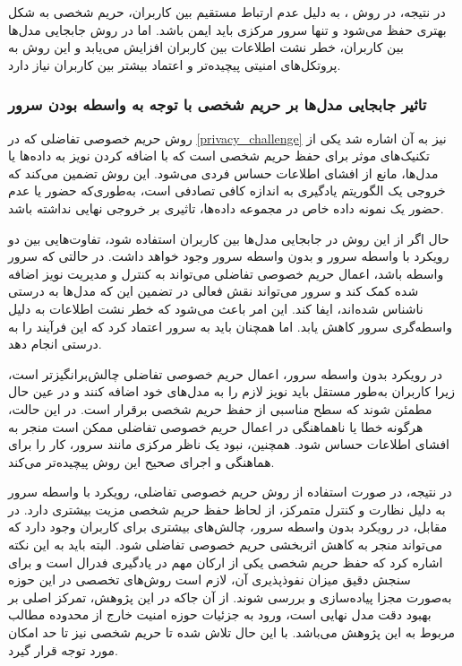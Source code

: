 در نتیجه، در روش
%
، به دلیل عدم ارتباط مستقیم بین کاربران، حریم شخصی به شکل بهتری حفظ می‌شود و تنها سرور مرکزی باید ایمن باشد. اما در روش جابجایی مدل‌ها بین کاربران، خطر نشت اطلاعات بین کاربران افزایش می‌یابد و این روش به پروتکل‌های امنیتی پیچیده‌تر و اعتماد بیشتر بین کاربران نیاز دارد.


\subsubsection{
	تاثیر جابجایی مدل‌ها بر حریم شخصی با توجه به واسطه بودن سرور
}
روش حریم خصوصی تفاضلی که در
\ref{privacy_challenge}
نیز به آن اشاره شد یکی از تکنیک‌های موثر برای حفظ حریم شخصی است که با اضافه کردن نویز به داده‌ها یا مدل‌ها، مانع از افشای اطلاعات حساس فردی می‌شود. این روش تضمین می‌کند که خروجی یک الگوریتم یادگیری به اندازه کافی تصادفی است، به‌طوری‌که حضور یا عدم حضور یک نمونه داده خاص در مجموعه داده‌ها، تاثیری بر خروجی نهایی نداشته باشد.

حال اگر از این روش در جابجایی مدل‌ها بین کاربران استفاده شود، تفاوت‌هایی بین دو رویکرد با واسطه سرور و بدون واسطه سرور وجود خواهد داشت. در حالتی که سرور واسطه باشد، اعمال حریم خصوصی تفاضلی می‌تواند به کنترل و مدیریت نویز اضافه شده کمک کند و سرور می‌تواند نقش فعالی در تضمین این که مدل‌ها به درستی ناشناس‌ شده‌اند، ایفا کند. این امر باعث می‌شود که خطر نشت اطلاعات به دلیل واسطه‌گری سرور کاهش یابد. اما همچنان باید به سرور اعتماد کرد که این فرآیند را به درستی انجام دهد.

در رویکرد بدون واسطه سرور، اعمال حریم خصوصی تفاضلی چالش‌برانگیزتر است، زیرا کاربران به‌طور مستقل باید نویز لازم را به مدل‌های خود اضافه کنند و در عین حال مطمئن شوند که سطح مناسبی از حفظ حریم شخصی برقرار است. در این حالت، هرگونه خطا یا ناهماهنگی در اعمال حریم خصوصی تفاضلی ممکن است منجر به افشای اطلاعات حساس شود. همچنین، نبود یک ناظر مرکزی مانند سرور، کار را برای هماهنگی و اجرای صحیح این روش پیچیده‌تر می‌کند.

در نتیجه، در صورت استفاده از روش حریم خصوصی تفاضلی، رویکرد با واسطه سرور به دلیل نظارت و کنترل متمرکز، از لحاظ حفظ حریم شخصی مزیت بیشتری دارد. در مقابل، در رویکرد بدون واسطه سرور، چالش‌های بیشتری برای کاربران وجود دارد که می‌تواند منجر به کاهش اثربخشی حریم خصوصی تفاضلی شود.
البته باید به این نکته اشاره کرد که حفظ حریم شخصی یکی از ارکان مهم در یادگیری فدرال است و برای سنجش دقیق میزان نفوذپذیری آن، لازم است روش‌های تخصصی در این حوزه به‌صورت مجزا پیاده‌سازی و بررسی شوند.
از آن جاکه در این پژوهش، تمرکز اصلی بر بهبود دقت مدل نهایی است، ورود به جزئیات حوزه امنیت خارج از محدوده مطالب مربوط به این پژوهش می‌باشد. با این حال تلاش شده تا حریم شخصی نیز تا حد امکان مورد توجه قرار گیرد.





